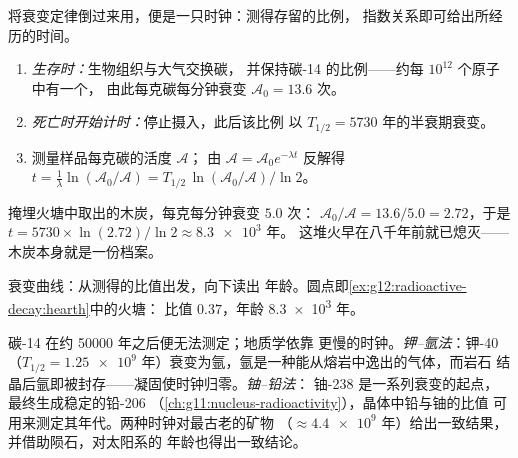 将衰变定律倒过来用，便是一只时钟：测得存留的比例，
指数关系即可给出所经历的时间。

\begin{method}[放射性碳测年法]\label{met:g12:radioactive-decay:carbon}
\begin{enumerate}
  \item \emph{生存时：}生物组织与大气交换碳，
        并保持碳-14 的比例——约每 $10^{12}$ 个原子中有一个，
        由此每克碳每分钟衰变 $\mathcal A_0 = 13.6$ 次。
  \item \emph{死亡时开始计时：}停止摄入，此后该比例
        以 $T_{1/2} = \num{5730}$ 年的半衰期衰变。
  \item 测量样品每克碳的活度 $\mathcal A$；
        由 $\mathcal A = \mathcal A_0 e^{-\lambda t}$ 反解得
        $t = \frac{1}{\lambda}\ln(\mathcal A_0/\mathcal A)
        = T_{1/2}\,\ln(\mathcal A_0/\mathcal A)/\ln 2$。
\end{enumerate}
\end{method}

\begin{example}[洞穴中的一处火塘]\label{ex:g12:radioactive-decay:hearth}
掩埋火塘中取出的木炭，每克每分钟衰变 $5.0$ 次：
$\mathcal A_0/\mathcal A = 13.6/5.0 = 2.72$，于是
$t = \num{5730} \times \ln(2.72)/\ln 2 \approx \num{8.3e3}$ 年。
这堆火早在八千年前就已熄灭——木炭本身就是一份档案。
\end{example}

\begin{omfigure}

{\small 衰变曲线：从测得的比值出发，向下读出
年龄。圆点即\cref{ex:g12:radioactive-decay:hearth}中的火塘：
比值 $0.37$，年龄 \num{8.3e3} 年。}
\end{omfigure}

\begin{example}[岩石的时钟]\label{ex:g12:radioactive-decay:rocks}
碳-14 在约 \num{50000} 年之后便无法测定；地质学依靠
更慢的时钟。\emph{钾–氩法}：钾-40（$T_{1/2} = \num{1.25e9}$
年）衰变为氩，氩是一种能从熔岩中逸出的气体，而岩石
结晶后氩即被封存——凝固使时钟归零。\emph{铀–铅法}：
铀-238 是一系列衰变的起点，最终生成稳定的铅-206
（\cref{ch:g11:nucleus-radioactivity}），晶体中铅与铀的比值
可用来测定其年代。两种时钟对最古老的矿物
（$\approx \num{4.4e9}$ 年）给出一致结果，并借助陨石，对太阳系的
年龄也得出一致结论。
\end{example}

